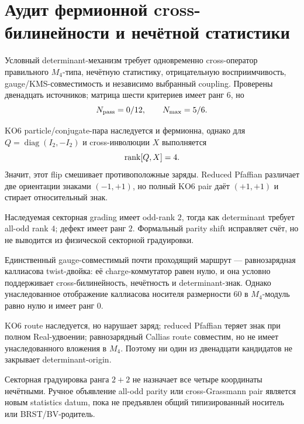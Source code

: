 \chapter{Аудит фермионной cross-билинейности и нечётной статистики}
\label{ch:v10-m4-fermionic-cross-odd-audit}

Условный determinant-механизм требует одновременно cross-оператор
правильного $M_4$-типа, нечётную статистику, отрицательную восприимчивость,
gauge/KMS-совместимость и независимо выбранный coupling. Проверены
двенадцать источников; матрица шести критериев имеет ранг $6$, но
\begin{equation}
 N_{\rm pass}=0/12,\qquad N_{\rm max}=5/6.
\end{equation}

KO6 particle/conjugate-пара наследуется и фермионна, однако для
$Q=\operatorname{diag}(I_2,-I_2)$ и cross-инволюции $X$ выполняется
\begin{equation}
 \operatorname{rank}[Q,X]=4.
\end{equation}
Значит, этот flip смешивает противоположные заряды. Reduced Pfaffian
различает две ориентации знаками $(-1,+1)$, но полный KO6 pair даёт
$(+1,+1)$ и стирает относительный знак.

Наследуемая секторная grading имеет odd-rank $2$, тогда как determinant
требует all-odd rank $4$; дефект имеет ранг $2$. Формальный parity shift
исправляет счёт, но не выводится из физической секторной градуировки.

Единственный gauge-совместимый почти проходящий маршрут --- равнозарядная
каллиасова twist-двойка: её charge-коммутатор равен нулю, и она условно
поддерживает cross-билинейность, нечётность и determinant-знак. Однако
унаследованное отображение каллиасова носителя размерности $60$ в
$M_4$-модуль равно нулю и имеет ранг $0$.

\begin{theorem}
KO6 route наследуется, но нарушает заряд; reduced Pfaffian теряет знак при
полном Real-удвоении; равнозарядный Callias route совместим, но не имеет
унаследованного вложения в $M_4$. Поэтому ни один из двенадцати кандидатов
не закрывает determinant-origin.
\end{theorem}

\begin{nogocriterion}
Секторная градуировка ранга $2+2$ не назначает все четыре координаты
нечётными. Ручное объявление all-odd parity или cross-Grassmann pair
является новым statistics datum, пока не предъявлен общий типизированный
носитель или BRST/BV-родитель.
\end{nogocriterion}

